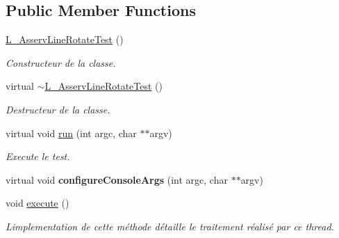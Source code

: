 \subsection*{Public Member Functions}
\begin{DoxyCompactItemize}
\item 
\mbox{\label{classL__AsservLineRotateTest_a9ff6abfdcbb48a2f1c86fe7a5ae90d01}} 
\hyperlink{classL__AsservLineRotateTest_a9ff6abfdcbb48a2f1c86fe7a5ae90d01}{L\+\_\+\+Asserv\+Line\+Rotate\+Test} ()
\begin{DoxyCompactList}\small\item\em Constructeur de la classe. \end{DoxyCompactList}\item 
\mbox{\label{classL__AsservLineRotateTest_a10aa3aa20ffbf38b1a434be6d0bb2150}} 
virtual \hyperlink{classL__AsservLineRotateTest_a10aa3aa20ffbf38b1a434be6d0bb2150}{$\sim$\+L\+\_\+\+Asserv\+Line\+Rotate\+Test} ()
\begin{DoxyCompactList}\small\item\em Destructeur de la classe. \end{DoxyCompactList}\item 
\mbox{\label{classL__AsservLineRotateTest_a3130bff61c4efa01f140441a74224f12}} 
virtual void \hyperlink{classL__AsservLineRotateTest_a3130bff61c4efa01f140441a74224f12}{run} (int argc, char $\ast$$\ast$argv)
\begin{DoxyCompactList}\small\item\em Execute le test. \end{DoxyCompactList}\item 
\mbox{\label{classL__AsservLineRotateTest_aa0284563506b395d665bfa08ef1b50ce}} 
virtual void {\bfseries configure\+Console\+Args} (int argc, char $\ast$$\ast$argv)
\item 
\mbox{\label{classL__AsservLineRotateTest_a3113b83e94f9ae7ad5b54fe8c2f12998}} 
void \hyperlink{classL__AsservLineRotateTest_a3113b83e94f9ae7ad5b54fe8c2f12998}{execute} ()
\begin{DoxyCompactList}\small\item\em L\textquotesingle{}implementation de cette méthode détaille le traitement réalisé par ce thread. \end{DoxyCompactList}\end{DoxyCompactItemize}
